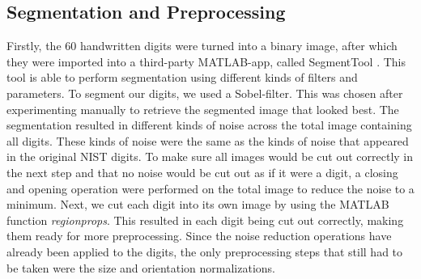 \documentclass[11pt,twoside,a4paper]{article}
\begin{document}
\subsection{Segmentation and Preprocessing}
Firstly, the 60 handwritten digits were turned into a binary image, after which they were imported into a third-party MATLAB-app, called SegmentTool \cite{segmenttool}. This tool is able to perform segmentation using different kinds of filters and parameters. To segment our digits, we used a Sobel-filter. This was chosen after experimenting manually to retrieve the segmented image that looked best.\newline
\newline
The segmentation resulted in different kinds of noise across the total image containing all digits. These kinds of noise were the same as the kinds of noise that appeared in the original NIST digits. To make sure all images would be cut out correctly in the next step and that no noise would be cut out as if it were a digit, a closing and opening operation were performed on the total image to reduce the noise to a minimum. Next, we cut each digit into its own image by using the MATLAB function \emph{regionprops}. This resulted in each digit being cut out correctly, making them ready for more preprocessing. Since the noise reduction operations have already been applied to the digits, the only preprocessing steps that still had to be taken were the size and orientation normalizations.
\end{document}
